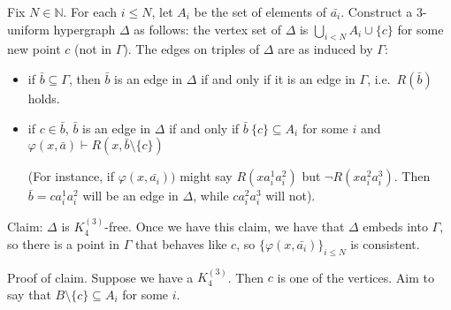 \documentclass{article}
\begin{document}
\begin{eg}
\begin{enumerate}
\begin{enumerate}[(a)]
          Fix $N \in \mathbb{N}$. For each $i \leq N$, let $A_i$ be the set of elements of $\bar{a_i}$.
          Construct a $3$-uniform hypergraph $\Delta$ as follows:
          the vertex set of $\Delta$ is $\bigcup_{i < N} A_i \cup \{c\}$ for some new point $c$ (not in $\Gamma$).
          The edges on triples of $\Delta$ are as induced by $\Gamma$:
          \begin{itemize}
            \item if $\bar{b} \subseteq \Gamma$, then $\bar{b}$ is an edge in $\Delta$ if and only if it is an edge in $\Gamma$, i.e.\ $R(\bar{b})$ holds.
            \item if $c \in \bar{b}$, $\bar{b}$ is an edge in $\Delta$ if and only if $\bar{b}\ \{c\} \subseteq A_i$ for some $i$ and $\varphi(x,\bar{a}) \vdash R(x,\bar{b}\setminus \{c\})$

              (For instance, if $\varphi(x,\bar{a_i}))$ might say $R(x a_i^1 a_i^2)$ but $\neg R(x a_i^2  a_i^3)$.
              Then $\bar{b} = c a_i^1 a_i^2$ will be an edge in $\Delta$, while $c a_i^2 a_i^3$ will not).
          \end{itemize}
          Claim: $\Delta$ is $K_4^{(3)}$-free.
          Once we have this claim, we have that $\Delta$ embeds into $\Gamma$, so there is a point in $\Gamma$ that behaves like $c$, so $\{\varphi(x,\bar{a_i})\}_{i \leq N}$ is consistent.

          Proof of claim. Suppose we have a $K_4^{(3)}$. Then $c$ is one of the vertices.
          Aim to say that $B \setminus \{c\} \subseteq A_i$ for some $i$.
      \end{enumerate}
  \end{enumerate}
\end{eg}
\printindex
\end{document}
